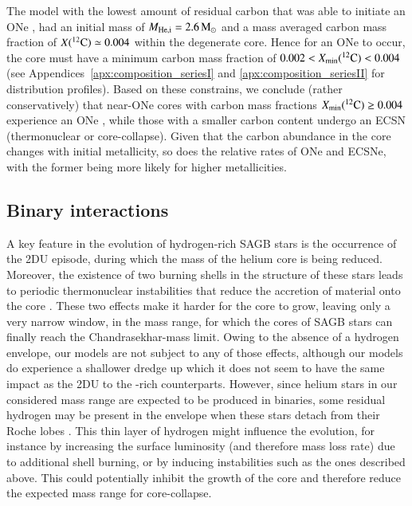 \documentclass[main.tex]{subfiles}
\begin{document}
The  model with the lowest amount of residual carbon that was able to initiate an ONe \ia, 
had an initial mass of $M_{\rm He, i}=2.6\msun$ and a mass averaged carbon mass fraction of $X(\iso{C}{12})\simeq 0.004$ within the degenerate core. 
Hence for an ONe \ia to occur, the core must have a minimum carbon mass fraction of $0.002 < X_{\rm min}(\iso{C}{12}) < 0.004$ (see Appendices~\ref{apx:composition_seriesI} and \ref{apx:composition_seriesII} for distribution profiles).  
Based on these constrains, we conclude (rather conservatively) that near-\mch  ONe cores with carbon mass fractions $X_{\rm min}(\iso{C}{12}) \geq 0.004$ experience an ONe \ia, while those with a smaller carbon content undergo an ECSN (thermonuclear or core-collapse).
Given that the carbon abundance in the core changes with initial metallicity, so does the relative rates of ONe \ias and ECSNe, with the former being more likely for higher metallicities. 




\subsection{Binary interactions}

A key feature in the evolution of hydrogen-rich SAGB stars is the occurrence of the 
2DU episode, during which the mass of the helium core is being reduced. Moreover, the existence of two 
burning shells in the structure of these stars leads to periodic thermonuclear instabilities 
that reduce the accretion of material onto the core \citep{Denissenkov:2013qaa}. 
These two effects make it harder for the 
core to grow, leaving only a very narrow window, in the mass range, for which the cores of SAGB 
stars can finally reach the Chandrasekhar-mass limit. Owing to the absence of a hydrogen envelope, 
our models are not subject to any of those effects, although our models do experience a shallower dredge up which it does not seem to have the same impact as the 2DU to the -rich counterparts. However, since helium stars in our considered mass range are expected to be produced in binaries, some residual hydrogen may be present in the envelope when these stars detach from their Roche lobes \citep[][and references therein]{Sen:2022abc}. This thin layer of hydrogen might  
influence the evolution, for instance by increasing the surface luminosity (and therefore mass loss rate) due to additional shell burning, or by inducing  instabilities such as the ones described above. This could potentially inhibit the growth of the core and therefore reduce the expected mass range for core-collapse.  
\end{document}
